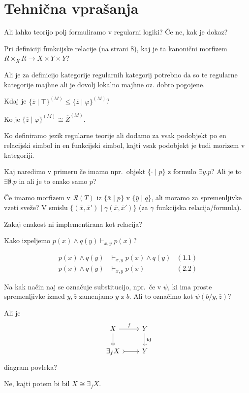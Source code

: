 \documentclass[12pt,a4paper]{article}
\newcommand\ans{\item[\textbf{A:}]}
\newcommand{\set}[1]{\lbrace #1 \rbrace}
\begin{document}
    \section*{Tehnična vprašanja}
    \begin{vprasanja}
        \item Ali lahko teorijo polj formuliramo v regularni logiki? Če ne, kak je dokaz?
        \ans
        \item Pri definiciji funkcijske relacije (na strani 8), kaj je ta kanonični morfizem $R \times_X R \to X \times Y \times Y$?
        \ans
        \item Ali je za definicijo kategorije regularnih kategorij potrebno da so te regularne kategorije majhne ali je dovolj lokalno majhne oz. dobro pogojene.
        \ans
        \item Kdaj je $\lbrace \overline{z} \mid \top \rbrace^{(M)} \leq \lbrace \overline{z} \mid \varphi \rbrace^{(M)}$?
        \ans Ko je $\lbrace \overline{z} \mid \varphi \rbrace^{(M)} \cong \overline{Z}^{(M)}$.
        \item Ko definiramo jezik regularne teorije ali dodamo za vsak podobjekt po en relacijski simbol in en funkcijski simbol,
            kajti vsak podobjekt je tudi morizem v kategoriji.
        \ans
        \item Kaj naredimo v primeru če imamo npr.\ objekt $\lbrace \cdot \mid p \rbrace$ z formulo $\exists y . p$?
            Ali je to $\exists \emptyset . p$ in ali je to enako samo $p$?
        \ans
        \item Če imamo morfizem v $\mathcal{R}(T)$ iz $\set{ \bar{x} \mid p}$ v $\set{ \bar{y} \mid q}$, ali moramo za spremenljivke vzeti sveže?
            V smislu $\set{ (\bar{x}, \bar{x}') \mid \gamma(\bar{x}, \bar{x}')}$ (za $\gamma$ funkcijska relacija/formula).
        \ans
        \item Zakaj enakost ni implementirana kot relacija?
        \ans
        \item Kako izpeljemo $p(x) \wedge q(y) \vdash_{x,y} p(x)$?
        \ans 
            \begin{align*}
               p(x) \wedge q(y) &\vdash_{x,y} p(x) \wedge q(y)  &(1.1) \\
               p(x) \wedge q(y) &\vdash_{x,y} p(x) &(2.2)
            \end{align*}
        \item Na kak način naj se označuje substitucijo, npr.~če v $\psi$, ki ima proste spremenljivke izmed
            $y,\bar{z}$ zamenjamo $y$ z $b$. Ali to označimo kot $\psi(b/y, \bar{z})$?
        \ans
        \item Ali je 
            \begin{equation*}
            \begin{tikzcd}
                X \ar[d, two heads] \ar[r, "f"] & Y \ar[d, "\mathrm{id}"] \\
                \exists_f X \ar[r, tail] & Y 
            \end{tikzcd}
            \end{equation*}
            diagram povleka?
        \ans Ne, kajti potem bi bil $X \cong \exists_f X$.
    \end{vprasanja}
\end{document}
